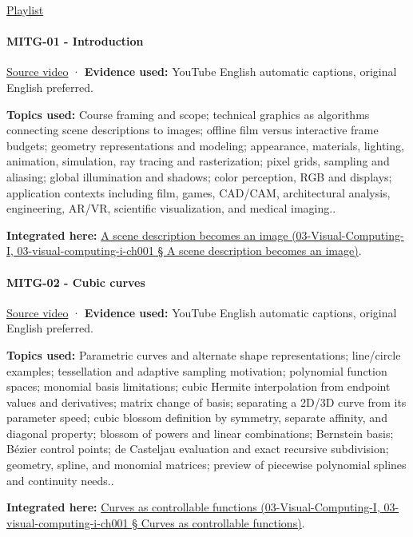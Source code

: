 \href{https://www.youtube.com/playlist?list=PLQ3UicqQtfNtqt2yL3KgKV-yn0NEPbRVi}{Playlist}

\paragraph{MITG-01 - Introduction}\label{mitg-01---introduction}

\href{https://www.youtube.com/watch?v=tPzC879i-ag}{Source video} · \textbf{Evidence used:} YouTube English automatic captions, original English preferred.

\textbf{Topics used:} Course framing and scope; technical graphics as algorithms connecting scene descriptions to images; offline film versus interactive frame budgets; geometry representations and modeling; appearance, materials, lighting, animation, simulation, ray tracing and rasterization; pixel grids, sampling and aliasing; global illumination and shadows; color perception, RGB and displays; application contexts including film, games, CAD/CAM, architectural analysis, engineering, AR/VR, scientific visualization, and medical imaging..

\textbf{Integrated here:} \href{}{A scene description becomes an image (03-Visual-Computing-I, 03-visual-computing-i-ch001 § A scene description becomes an image)}.

\paragraph{MITG-02 - Cubic curves}\label{mitg-02---cubic-curves}

\href{https://www.youtube.com/watch?v=1BZ0ayVjWEk}{Source video} · \textbf{Evidence used:} YouTube English automatic captions, original English preferred.

\textbf{Topics used:} Parametric curves and alternate shape representations; line/circle examples; tessellation and adaptive sampling motivation; polynomial function spaces; monomial basis limitations; cubic Hermite interpolation from endpoint values and derivatives; matrix change of basis; separating a 2D/3D curve from its parameter speed; cubic blossom definition by symmetry, separate affinity, and diagonal property; blossom of powers and linear combinations; Bernstein basis; Bézier control points; de Casteljau evaluation and exact recursive subdivision; geometry, spline, and monomial matrices; preview of piecewise polynomial splines and continuity needs..

\textbf{Integrated here:} \href{}{Curves as controllable functions (03-Visual-Computing-I, 03-visual-computing-i-ch001 § Curves as controllable functions)}.

